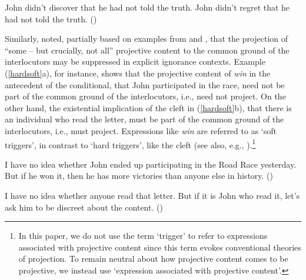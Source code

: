 \documentclass[11pt,fleqn]{article}
\newcommand{\6}{\mbox{$[\hspace*{-.6mm}[$}}
\newcommand{\9}{\mbox{$]\hspace*{-.6mm}]$}}
\def\infelic{{\leavevmode\llap{\#}}}
\begin{document}
\begin{exe}
\ex\label{semi-factive}
\begin{xlist}
\ex John didn't discover that he had not told the truth.  
\ex John didn't regret that he had not told the truth.
\hfill (\citealt[63]{karttunen71b})

\end{xlist}
\end{exe}

Similarly, \citet[432]{simons01} noted, partially based on examples from \citealt{ccmg90} and \citealt{geurts94}, that the projection of ``some -- but crucially, not all'' projective content to the common ground of the interlocutors may be suppressed in explicit ignorance contexts. Example (\ref{hardsoft}a), for instance, shows that the projective content of {\em win} in the antecedent of the conditional, that John participated in the race, need not be part of the common ground of the interlocutors, i.e., need not project. On the other hand, the existential implication of the cleft in (\ref{hardsoft}b), that there is an individual who read the letter, must be part of the common ground of the interlocutors, i.e., must project. Expressions like {\em win} are referred to as `soft triggers', in contrast to `hard triggers', like the cleft (see also, e.g., \citealt{abusch10}).\footnote{In this paper, we do not use the term `trigger' to refer to expressions associated with projective content since this term evokes conventional theories of projection. To remain neutral about how projective content comes to be projective, we instead use `expression associated with projective content'.}

\begin{exe}
\ex\label{hardsoft}
\begin{xlist}

\ex I have no idea whether John ended up participating in the Road Race yesterday. But if he won it, then he has more victories than anyone else in history. \hfill (\citealt[39]{abusch10})

\ex\infelic I have no idea whether anyone read that letter. But if it is John
who read it, let's ask him to be discreet about the content. \hfill (\citealt[40]{abusch10})

\end{xlist}
\end{exe}
\end{document}
